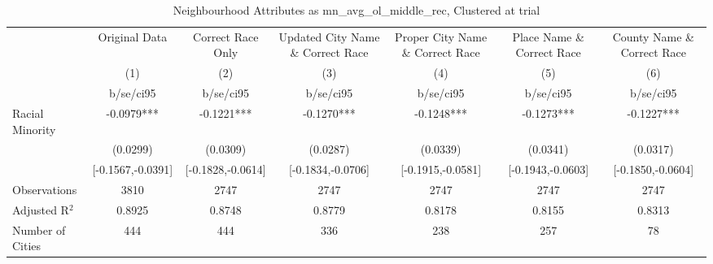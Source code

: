 \documentclass{article}
\begin{document}
\begin{table}[htbp]\centering
\def\sym#1{\ifmmode^{#1}\else\(^{#1}\)\fi}
\caption{Neighbourhood Attributes as mn\_avg\_ol\_middle\_rec, Clustered at trial}
\begin{tabular}{l*{6}{c}}
\toprule
                    &\multicolumn{1}{c}{Original Data}&\multicolumn{1}{c}{Correct Race Only}&\multicolumn{1}{c}{Updated City Name \& Correct Race}&\multicolumn{1}{c}{Proper City Name \& Correct Race}&\multicolumn{1}{c}{Place Name \& Correct Race}&\multicolumn{1}{c}{County Name \& Correct Race}\\\cmidrule(lr){2-2}\cmidrule(lr){3-3}\cmidrule(lr){4-4}\cmidrule(lr){5-5}\cmidrule(lr){6-6}\cmidrule(lr){7-7}
                    &\multicolumn{1}{c}{(1)}   &\multicolumn{1}{c}{(2)}   &\multicolumn{1}{c}{(3)}   &\multicolumn{1}{c}{(4)}   &\multicolumn{1}{c}{(5)}   &\multicolumn{1}{c}{(6)}   \\
                    &   b/se/ci95   &   b/se/ci95   &   b/se/ci95   &   b/se/ci95   &   b/se/ci95   &   b/se/ci95   \\
\midrule
Racial Minority     &     -0.0979***&     -0.1221***&     -0.1270***&     -0.1248***&     -0.1273***&     -0.1227***\\
                    &    (0.0299)   &    (0.0309)   &    (0.0287)   &    (0.0339)   &    (0.0341)   &    (0.0317)   \\
                    &[-0.1567,-0.0391]   &[-0.1828,-0.0614]   &[-0.1834,-0.0706]   &[-0.1915,-0.0581]   &[-0.1943,-0.0603]   &[-0.1850,-0.0604]   \\
\midrule
Observations        &        3810   &        2747   &        2747   &        2747   &        2747   &        2747   \\
Adjusted R$^2$      &      0.8925   &      0.8748   &      0.8779   &      0.8178   &      0.8155   &      0.8313   \\
Number of Cities    &         444   &         444   &         336   &         238   &         257   &          78   \\
\bottomrule
\end{tabular}
\end{table}
\end{document}
